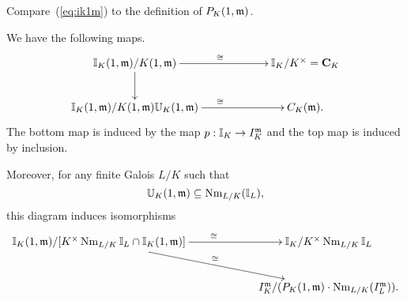 Compare~(\ref{eq:ik1m}) to the definition of $P_{K}(1, \mathfrak{m})$.
\begin{pr}
We have the following maps.
\[
\xymatrixcolsep{5pc}
\xymatrix{
\I_K(1,\mm)/K(1,\mm) \ar[r]^{\cong}\ar[d] & \I_K/K^{\times}=\mathbf C_K\\
\I_K(1,\mm)/K(1,\mm)\mathbb U_K(1,\mm)\ar[r]^{\cong} & C_K(\mm).
}
\]
The bottom map is induced by the map $p:\mathbb{I}_K\to I_K^{\mathfrak{m}}$ and the top map is induced by inclusion.

Moreover, for any finite Galois $L/K$ such that %
\[
\mathbb U_K(1,\mathfrak{m})\subseteq \operatorname{Nm}_{L/K}(\mathbb{I}_L),
\]
this diagram induces isomorphisms
\[
\xymatrixcolsep{5pc}
\xymatrix{
\I_K(1, \mm)/[%
K^{\times}
\nm_{L/K} \I_L\cap \I_K(1, \mm)
]\ar[r]^{\cong}\ar[rd]^{\cong} & \I_K/K^{\times}\nm_{L/K} \I_L\\
& I_K^{\mm}/(P_{K}(1,\mm)\cdot \nm_{L/K}(I_L^{\mm})).
}
\]
\end{pr}
